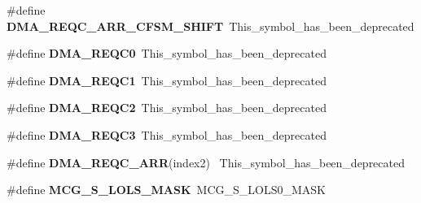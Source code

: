\begin{DoxyCompactItemize}
\item 
\hypertarget{group___backward___compatibility___symbols_ga7130ea81cb843080f9c2ec4e537cd81c}{}\#define {\bfseries D\+M\+A\+\_\+\+R\+E\+Q\+C\+\_\+\+A\+R\+R\+\_\+\+C\+F\+S\+M\+\_\+\+S\+H\+I\+F\+T}~This\+\_\+symbol\+\_\+has\+\_\+been\+\_\+deprecated\label{group___backward___compatibility___symbols_ga7130ea81cb843080f9c2ec4e537cd81c}

\item 
\hypertarget{group___backward___compatibility___symbols_ga734643acca0a28e7a07dc8c705fbc1f8}{}\#define {\bfseries D\+M\+A\+\_\+\+R\+E\+Q\+C0}~This\+\_\+symbol\+\_\+has\+\_\+been\+\_\+deprecated\label{group___backward___compatibility___symbols_ga734643acca0a28e7a07dc8c705fbc1f8}

\item 
\hypertarget{group___backward___compatibility___symbols_gadfccb3dbbd2bc4fc89afd35a2743d074}{}\#define {\bfseries D\+M\+A\+\_\+\+R\+E\+Q\+C1}~This\+\_\+symbol\+\_\+has\+\_\+been\+\_\+deprecated\label{group___backward___compatibility___symbols_gadfccb3dbbd2bc4fc89afd35a2743d074}

\item 
\hypertarget{group___backward___compatibility___symbols_ga49eb3e3e2e8e2323ffcc73e88075672f}{}\#define {\bfseries D\+M\+A\+\_\+\+R\+E\+Q\+C2}~This\+\_\+symbol\+\_\+has\+\_\+been\+\_\+deprecated\label{group___backward___compatibility___symbols_ga49eb3e3e2e8e2323ffcc73e88075672f}

\item 
\hypertarget{group___backward___compatibility___symbols_ga9fe628acf4e42637941f92c2886494b8}{}\#define {\bfseries D\+M\+A\+\_\+\+R\+E\+Q\+C3}~This\+\_\+symbol\+\_\+has\+\_\+been\+\_\+deprecated\label{group___backward___compatibility___symbols_ga9fe628acf4e42637941f92c2886494b8}

\item 
\hypertarget{group___backward___compatibility___symbols_ga0219a9cca9177ed55c20784941439140}{}\#define {\bfseries D\+M\+A\+\_\+\+R\+E\+Q\+C\+\_\+\+A\+R\+R}(index2)                                      ~This\+\_\+symbol\+\_\+has\+\_\+been\+\_\+deprecated\label{group___backward___compatibility___symbols_ga0219a9cca9177ed55c20784941439140}

\item 
\hypertarget{group___backward___compatibility___symbols_ga247a34b938aaa44d22f5cd4f56d95987}{}\#define {\bfseries M\+C\+G\+\_\+\+S\+\_\+\+L\+O\+L\+S\+\_\+\+M\+A\+S\+K}~M\+C\+G\+\_\+\+S\+\_\+\+L\+O\+L\+S0\+\_\+\+M\+A\+S\+K\label{group___backward___compatibility___symbols_ga247a34b938aaa44d22f5cd4f56d95987}


\end{DoxyCompactItemize}
